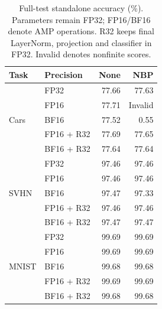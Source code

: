 \begin{table}[!htbp]
\centering
\small
\setlength{\tabcolsep}{3pt}
\caption{Full-test standalone accuracy (\%). Parameters remain FP32; FP16/BF16 denote AMP operations. R32 keeps final LayerNorm, projection and classifier in FP32. Invalid denotes nonfinite scores.}
\label{tab:precision-inference}
\begin{tabular}{llrr}
\toprule
Task & Precision & None & NBP \\
\midrule
\multirow{5}{*}{Cars} & FP32 & 77.66 & 77.63 \\
 & FP16 & 77.71 & Invalid \\
 & BF16 & 77.52 & 0.55 \\
 & FP16 + R32 & 77.69 & 77.65 \\
 & BF16 + R32 & 77.64 & 77.64 \\
\midrule
\multirow{5}{*}{SVHN} & FP32 & 97.46 & 97.46 \\
 & FP16 & 97.46 & 97.46 \\
 & BF16 & 97.47 & 97.33 \\
 & FP16 + R32 & 97.46 & 97.46 \\
 & BF16 + R32 & 97.47 & 97.47 \\
\midrule
\multirow{5}{*}{MNIST} & FP32 & 99.69 & 99.69 \\
 & FP16 & 99.69 & 99.69 \\
 & BF16 & 99.68 & 99.68 \\
 & FP16 + R32 & 99.69 & 99.69 \\
 & BF16 + R32 & 99.68 & 99.68 \\
\bottomrule
\end{tabular}
\end{table}
